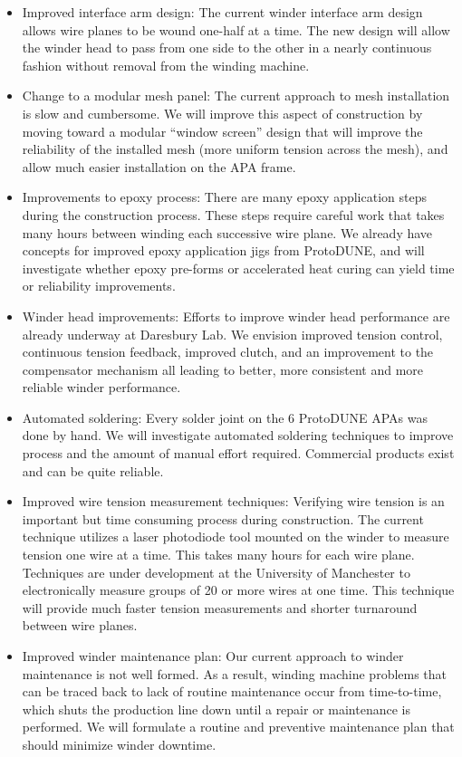 \begin{itemize}
\item Improved interface arm design: The current winder interface arm design allows wire planes to be wound one-half at a time. The new design will allow the winder head to pass from one side to the other in a nearly continuous fashion without removal from the winding machine. 
\item Change to a modular mesh panel: The current approach to mesh installation is slow and cumbersome. We will improve this aspect of construction by moving toward a modular ``window screen'' design that will improve the reliability of the installed mesh (more uniform tension across the mesh), and allow much easier installation on the APA frame.
\item Improvements to epoxy process: There are many epoxy application steps during the construction process. These steps require careful work that takes many hours between winding each successive wire plane. We already have concepts for improved epoxy application jigs from ProtoDUNE, and will investigate whether epoxy pre-forms or accelerated heat curing can yield time or reliability improvements.
\item Winder head improvements: Efforts to improve winder head performance are already underway at Daresbury Lab. We envision improved tension control, continuous tension feedback, improved clutch, and an improvement to the compensator mechanism all leading to better, more consistent and more reliable winder performance.
\item Automated soldering: Every solder joint on the 6 ProtoDUNE APAs was done by hand. We will investigate automated soldering techniques to improve process and the amount of manual effort required. Commercial products exist and can be quite reliable.
\item Improved wire tension measurement techniques: Verifying wire tension is an important but time consuming process during construction. The current technique utilizes a laser photodiode tool mounted on the winder to measure tension one wire at a time. This takes many hours for each wire plane. Techniques are under development at the University of Manchester to electronically measure groups of 20 or more wires at one time. This technique will provide much faster tension measurements and shorter turnaround between wire planes. 
\item Improved winder maintenance plan: Our current approach to winder maintenance is not well formed. As a result, winding machine problems that can be traced back to lack of routine maintenance occur from time-to-time, which shuts the production line down until a repair  or maintenance is performed. We will formulate a routine and preventive maintenance plan that should minimize winder downtime.
\end{itemize}

